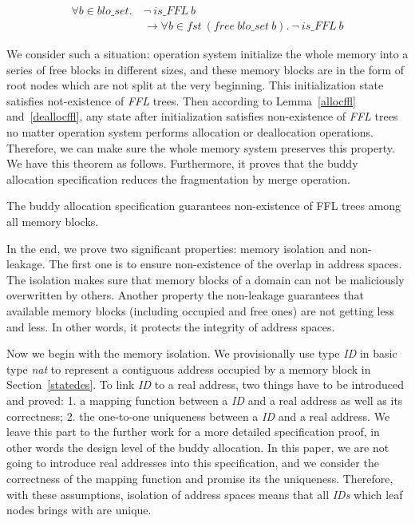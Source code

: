 \begin{lemma} 
\label{deallocffl}
\end{lemma}
\vspace{-7pt}
{\footnotesize
\begin{align*}
\forall b \in blo\_set.\ &\neg\ is\_FFL\ b \\
&\longrightarrow \forall b \in fst\ (free\ blo\_set\ b).\ \neg\ is\_FFL\ b
\end{align*}
}
\vspace{-12pt}

We consider such a situation: operation system initialize the whole memory into a series of free blocks in different sizes, and these memory blocks are in the form of root nodes which are not split at the very beginning. This initialization state satisfies not-existence of \emph{FFL} trees. Then according to Lemma~\ref{allocffl} and~\ref{deallocffl}, any state after initialization satisfies non-existence of \emph{FFL} trees no matter operation system performs allocation or deallocation operations. Therefore, we can make sure the whole memory system preserves this property. We have this theorem as follows. Furthermore, it proves that the buddy allocation specification reduces the fragmentation by merge operation.

\begin{theorem}
The buddy allocation specification guarantees non-existence of FFL trees among all memory blocks.
\end{theorem}

In the end, we prove two significant properties: memory isolation and non-leakage. The first one is to ensure non-existence of the overlap in address spaces. The isolation makes sure that memory blocks of a domain can not be maliciously overwritten by others. Another property the non-leakage guarantees that available memory blocks (including occupied and free ones) are not getting less and less. In other words, it protects the integrity of address spaces.

Now we begin with the memory isolation. We provisionally use type \emph{ID} in basic type \emph{nat} to represent a contiguous address occupied by a memory block in Section~\ref{statedes}. To link \emph{ID} to a real address, two things have to be introduced and proved: 1. a mapping function between a \emph{ID} and a real address as well as its correctness; 2. the one-to-one uniqueness between a \emph{ID} and a real address. We leave this part to the further work for a more detailed specification proof, in other words the design level of the buddy allocation. In this paper, we are not going to introduce real addresses into this specification, and we consider the correctness of the mapping function and promise its the uniqueness. Therefore, with these assumptions, isolation of address spaces means that all \emph{IDs} which leaf nodes brings with are unique.

